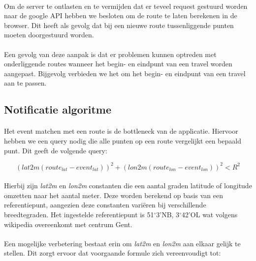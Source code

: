 \documentclass[11pt,twoside,a4paper]{article}
\begin{document}
	\paragraph{}
	Om de server te ontlasten en te vermijden dat er teveel request gestuurd worden naar de google API hebben we besloten om de route te laten berekenen in de browser. Dit heeft als gevolg dat bij een nieuwe route tussenliggende punten moeten doorgestuurd worden.
	
	\paragraph{}
	Een gevolg van deze aanpak is dat er problemen kunnen optreden met onderliggende routes wanneer het begin- en eindpunt van een travel worden aangepast. Bijgevolg verbieden we het om het begin- en eindpunt van een travel aan te passen.
	
	\subsection{Notificatie algoritme}	
	
	\paragraph{}
	Het event matchen met een route is de bottleneck van de applicatie. Hiervoor hebben we een query nodig die alle punten op een route vergelijkt een bepaald punt. Dit geeft de volgende query:
	
	\begin{equation}
	(lat2m (route_{lat} - event_{lat}))^{2} +(lon2m(route_{lon} - event_{lon}))^{2} < R^{2}
	\end{equation}
	
	\paragraph{}
	Hierbij zijn \emph{lat2m} en \emph{lon2m} constanten die een aantal graden latitude of longitude omzetten naar het aantal meter. Deze worden berekend op basis van een referentiepunt, aangezien deze constanten vari\"eren bij verschillende breedtegraden. Het ingestelde referentiepunt is 51$^{\circ}$3'NB, 3$^{\circ}$42'OL wat volgens wikipedia overeenkomt met centrum Gent.
	
	\paragraph{}
	Een mogelijke verbetering bestaat erin om \emph{lat2m} en \emph{lon2m} aan elkaar gelijk te stellen. Dit zorgt ervoor dat voorgaande formule zich vereenvoudigt tot:
	
\end{document}
